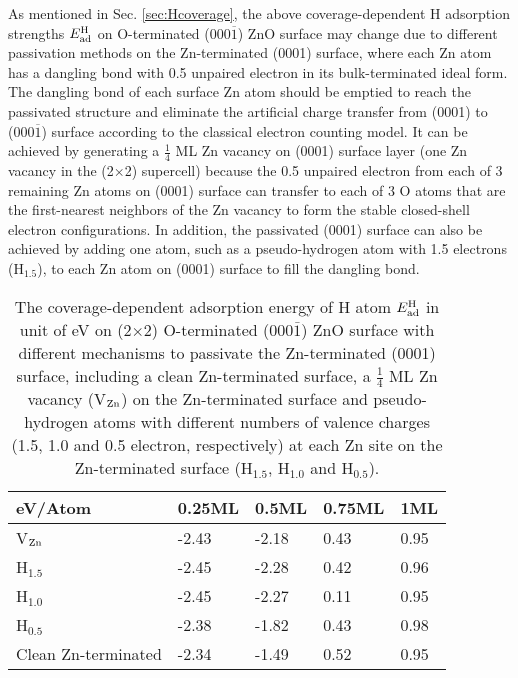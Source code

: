
As mentioned in Sec. \ref{sec:Hcoverage}, the above coverage-dependent H adsorption strengths $E_{\textup{ad}}^{\textup{H}}$ on O-terminated (000$\overline{1}$) ZnO surface may change due to different passivation methods on the Zn-terminated (0001) surface, where each Zn atom has a dangling bond with 0.5 unpaired electron in its bulk-terminated ideal form. The dangling bond of each surface Zn atom should be emptied to reach the passivated structure and eliminate the artificial charge transfer from (0001) to (000$\overline{1}$) surface according to the classical electron counting model\cite{pashley1989electron}. It can be achieved by generating a  $\frac{1}{4}$ ML Zn vacancy on (0001) surface layer (one Zn vacancy in the (2$\times$2) supercell) because the 0.5 unpaired electron from each of 3 remaining Zn atoms on (0001) surface can transfer to each of 3 O atoms that are the first-nearest neighbors of the Zn vacancy to form the stable closed-shell electron configurations. In addition, the passivated (0001) surface can also be achieved by adding one atom, such as a pseudo-hydrogen atom with 1.5 electrons (H$_{1.5}$), to each Zn atom on (0001) surface to fill the dangling bond.

\begin{table}[!htbp]
\centering
\caption[Comparison of different passivation mechanisms for the coverage-dependent adsorption energy of H atom]{The coverage-dependent adsorption energy of H atom $E_{\textup{ad}}^{\textup{H}}$ in unit of eV on (2$\times$2) O-terminated (000$\bar{1}$) ZnO surface with different mechanisms to passivate the Zn-terminated (0001) surface, including a clean Zn-terminated surface, a $\frac{1}{4}$ ML Zn vacancy (V$_{\textup{Zn}}$) on the Zn-terminated surface and pseudo-hydrogen atoms with different numbers of valence charges (1.5, 1.0 and 0.5 electron, respectively) at each Zn site on the Zn-terminated surface (H$_{1.5}$, H$_{1.0}$ and H$_{0.5}$).}
\label{tab:pass}
\begin{tabular}{lllll}
\hline
\hline
eV/Atom       & 0.25ML & 0.5ML & 0.75ML & 1ML  \\ \hline
V$_{\textup{Zn}}$     & -2.43  & -2.18 & 0.43   & 0.95 \\
H$_{1.5}$         & -2.45  & -2.28 & 0.42   & 0.96 \\
H$_{1.0}$         & -2.45  & -2.27 & 0.11   & 0.95 \\
H$_{0.5}$         & -2.38  & -1.82 & 0.43   & 0.98 \\ 
Clean Zn-terminated & -2.34  & -1.49 & 0.52   & 0.95 \\
\hline
\hline
\end{tabular}
\end{table}

